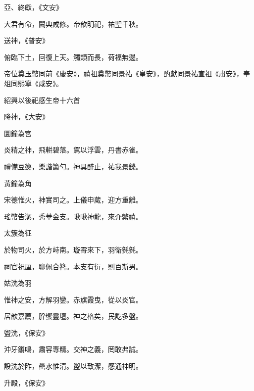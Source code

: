 \begin{pinyinscope}
 亞、終獻，《文安》



 大君有命，闕典咸修。帝歆明祀，祐聖千秋。



 送神，《普安》



 俯臨下土，回復上天。觸類而長，荷福無邊。



 帝位奠玉幣同前《慶安》，禧祖奠幣同景祐《皇安》，酌獻同景祐宣祖《肅安》，奉俎同熙寧《咸安》。



 紹興以後祀感生帝十六首



 降神，《大安》



 圜鐘為宮



 炎精之神，飛軿碧落。駕以浮雲，丹書赤雀。



 禮備豆籩，樂諧簫勺。神具醉止，祐我景鑠。



 黃鐘為角



 宋德惟火，神實司之。上儀申蕆，迎方重離。



 瑤幣告潔，秀華金支。啾啾神龍，來介繁禧。



 太簇為征



 於物司火，於方峙南。璇霄來下，羽衛毿毿。



 祠官祝厘，聊佩合簪。本支有衍，則百斯男。



 姑洗為羽



 惟神之安，方解羽鑾。赤旗霞曳，從以炎官。



 居歆嘉薦，肸蠁靈壇。神之格矣，民訖多盤。



 盥洗，《保安》



 沖牙鏘鳴，肅容專精。交神之義，罔敢弗誠。



 設洗於阼，罍水惟清。盥以致潔，感通神明。



 升殿，《保安》




\end{pinyinscope}
